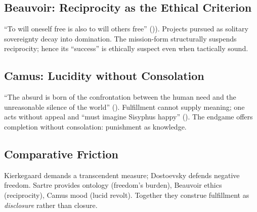 \documentclass[12pt]{article}
\begin{document}
\subsection*{Beauvoir: Reciprocity as the Ethical Criterion}
“To will oneself free is also to will others free” (\parencite[p.~73]{Beauvoir1976})). Projects pursued as solitary sovereignty decay into domination. The mission-form structurally suspends reciprocity; hence its “success” is ethically suspect even when tactically sound.

\subsection*{Camus: Lucidity without Consolation}
“The absurd is born of the confrontation between the human need and the unreasonable silence of the world” (\parencite[p.~28]{CamusMyth1991}). Fulfillment cannot supply meaning; one acts without appeal and “must imagine Sisyphus happy” (\parencite[p.~123]{CamusMyth1991}). The endgame offers completion without consolation: punishment as knowledge.

\subsection*{Comparative Friction}
Kierkegaard demands a transcendent measure; Dostoevsky defends negative freedom. Sartre provides ontology (freedom’s burden), Beauvoir ethics (reciprocity), Camus mood (lucid revolt). Together they construe fulfillment as \emph{disclosure} rather than closure.

\printbibliography
\end{document}
